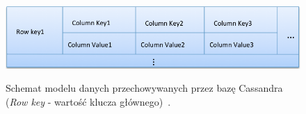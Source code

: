\begin{figure}[!ht]
 \begin{center}
  \scalebox{0.45}
  {
   \includegraphics{figures/generated_app_type/cassandra_model_primaryKey.png}
  }
 \end{center}
 \caption{Schemat modelu danych przechowywanych przez bazę Cassandra (\emph{Row key} - wartość klucza głównego)~\cite{cassandra_model}.}
 \label{fig:cassandra_model}
\end{figure}
